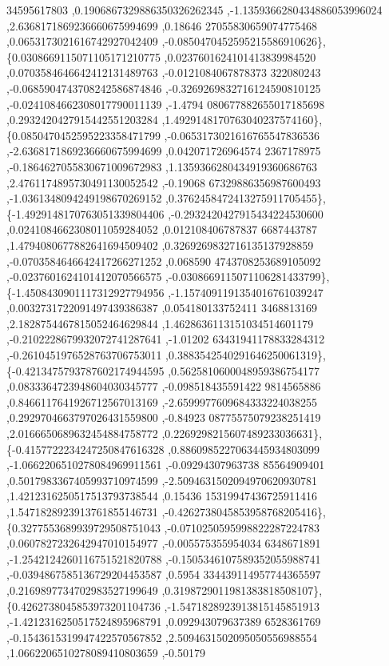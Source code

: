\begin{DoxyCode}
      34595617803 ,0.1906867329886350326262345 ,-1.1359366280434886053996024 ,2.6368171869236660675994699 ,0.18646
      27055830659074775468 ,0.0653173021616742927042409 ,-0.0850470452595215586910626\},
\{0.0308669115071105171210775 ,0.0237601624101413839984520 ,0.0703584646642412131489763 ,-0.0121084067878373
      322080243 ,-0.0685904743708242586874846 ,-0.3269269832716124590810125 ,-0.0241084662308017790011139 ,-1.4794
      080677882655017185698 ,0.2932420427915442551203284 ,1.4929148170763040237574160\},
\{0.0850470452595223358471799 ,-0.0653173021616765547836536 ,-2.6368171869236660675994699 ,0.042071726964574
      2367178975 ,-0.1864627055830671009672983 ,1.1359366280434919360686763 ,2.4761174895730491130052542 ,-0.19068
      67329886356987600493 ,-1.0361348094249198670269152 ,0.3762458472413275911705455\},
\{-1.4929148170763051339804406 ,-0.2932420427915434224530600 ,0.0241084662308011059284052 ,0.012108406787837
      6687443787 ,1.4794080677882641694509402 ,0.3269269832716135137928859 ,-0.0703584646642417266271252 ,0.068590
      4743708253689105092 ,-0.0237601624101412070566575 ,-0.0308669115071106281433799\},
\{-1.4508430901117312927794956 ,-1.1574091191354016761039247 ,0.0032731722091497439386387 ,0.054180133752411
      3468813169 ,2.1828754467815052464629844 ,1.4628636113151034514601179 ,-0.2102228679932072741287641 ,-1.01202
      63431941178833284312 ,-0.2610451976528763706753011 ,0.3883542540291646250061319\},
\{-0.4213475793787602174944595 ,0.5625810600048959386754177 ,0.0833364723948604030345777 ,-0.098518435591422
      9814565886 ,0.8466117641926712567013169 ,-2.6599977609684333224038255 ,0.2929704663797026431559800 ,-0.84923
      08775575079238251419 ,2.0166650689632454884758772 ,0.2269298215607489233036631\},
\{-0.4157722234247250847616328 ,0.8860985227063445934803099 ,-1.0662206510278084969911561 ,-0.09294307963738
      85564909401 ,0.5017983367405993710974599 ,-2.5094631502094970620930781 ,1.4212316250517513793738544 ,0.15436
      15319947436725911416 ,1.5471828923913761855146731 ,-0.4262738045853958768205416\},
\{0.3277553689939729508751043 ,-0.0710250595998822287224783 ,0.0607827232642947010154977 ,-0.005575355954034
      6348671891 ,-1.2542124260116751521820788 ,-0.1505346107589352055988741 ,-0.0394867585136729204453587 ,0.5954
      334439114957744365597 ,0.2169897734702983527199649 ,0.3198729011981383818508107\},
\{0.4262738045853973201104736 ,-1.5471828923913815145851913 ,-1.4212316250517524895968791 ,0.092943079637389
      6528361769 ,-0.1543615319947422570567852 ,2.5094631502095050556988554 ,1.0662206510278089410803659 ,-0.50179

\end{DoxyCode}
